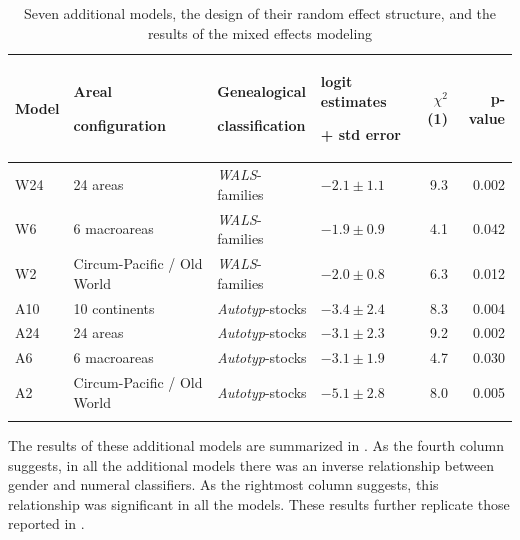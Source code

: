 \documentclass[output=collectionpaper]{langsci/langscibook}
\begin{document}
\begin{table}[htb]
\footnotesize
\begin{tabularx}{\textwidth}{lXXXrr}
\lsptoprule
\bfseries Model & {\bfseries Areal}

\bfseries configuration & {\bfseries Genealogical}

\bfseries classification & {\bfseries logit \linebreak estimates}

\bfseries + std error & \bfseries $\chi^2$ (1) & \bfseries p-value\\
\midrule
W24 & 24 areas & \textit{WALS}{}-families & $-2.1 \pm 1.1$ & 9.3 & 0.002\\
W6 & 6 macroareas & \textit{WALS}{}-families & $-1.9 \pm 0.9$ & 4.1 & 0.042\\
W2 & Circum-Pacific / Old World & \textit{WALS}{}-families & $-2.0 \pm 0.8$ & 6.3 & 0.012\\
A10 & 10 continents & \textit{Autotyp}{}-stocks & $-3.4 \pm 2.4$ & 8.3 & 0.004\\
A24 & 24 areas & \textit{Autotyp}{}-stocks & $-3.1 \pm 2.3$ & 9.2 & 0.002\\
A6 & 6 macroareas & \textit{Autotyp}{}-stocks & $-3.1 \pm 1.9$ & 4.7 & 0.030\\
A2 & Circum-Pacific / Old World & \textit{Autotyp}{}-stocks & $-5.1 \pm 2.8$ & 8.0 & 0.005\\
\lspbottomrule
\end{tabularx}
\caption{Seven additional models, the design of their random effect structure, and the results of the mixed effects modeling}
\label{tab:Sinne:4}
\end{table}

The results of these additional models are summarized in . As the fourth column suggests, in all the additional models there was an inverse relationship between gender and numeral classifiers. As the rightmost column suggests, this relationship was significant in all the models. These results further replicate those reported in .




\printbibliography[heading=subbibliography,notkeyword=this]

\label{lastpage:Sinne}
\end{document}
